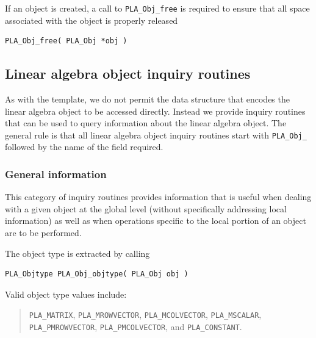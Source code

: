 If an object is created,
a call to {\tt PLA\_Obj\_free} is required to ensure
that all space associated with the object is properly released
\begin{FlaSpec}
\begin{verbatim}
PLA_Obj_free( PLA_Obj *obj )
\end{verbatim}
\end{FlaSpec}





\subsection{Linear algebra object inquiry routines}

As with the template, we do not permit the data structure that
encodes the linear algebra object to be accessed directly.
Instead we provide inquiry routines that can be used to query
information about the linear algebra object.  The general rule
is that all linear algebra object inquiry routines start with
{\tt PLA\_Obj\_} followed by the name of the field required.


\subsubsection{General information}

This category of inquiry routines provides information that is
useful when dealing with a given object at the global level
(without specifically addressing local information) as well as
when operations specific to the local portion of an object are to
be performed.

The object type is extracted by calling
\begin{FlaSpec}
\begin{verbatim}
PLA_Objtype PLA_Obj_objtype( PLA_Obj obj )
\end{verbatim}
\end{FlaSpec}
Valid object type values include:
\begin{quote}
{\tt PLA\_MATRIX}, {\tt PLA\_MROWVECTOR}, {\tt PLA\_MCOLVECTOR}, 
{\tt PLA\_MSCALAR}, \\
{\tt PLA\_PMROWVECTOR}, {\tt PLA\_PMCOLVECTOR}, and {\tt PLA\_CONSTANT}.
\end{quote}

